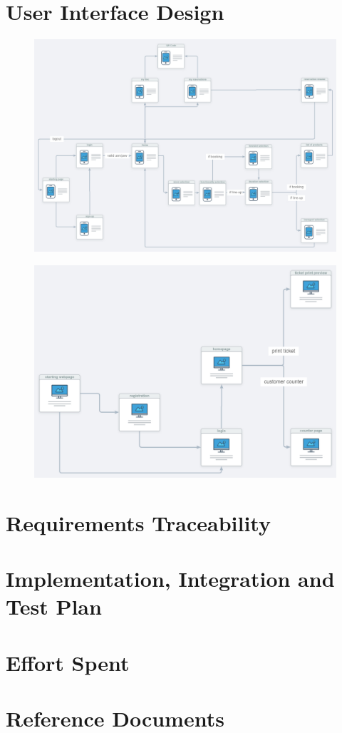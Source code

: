 \documentclass{article}
\begin{document}
\section{User Interface Design}
\begin{figure}[H]
  \includegraphics[width=\linewidth]{appUX.jpg}
  
\end{figure}
\begin{figure}[H]
  \includegraphics[width=\linewidth]{webUX.jpg}
  
\end{figure}

\section{Requirements Traceability}

\section{Implementation, Integration and Test Plan}

\section{Effort Spent}

\section{Reference Documents}
\end{document}
